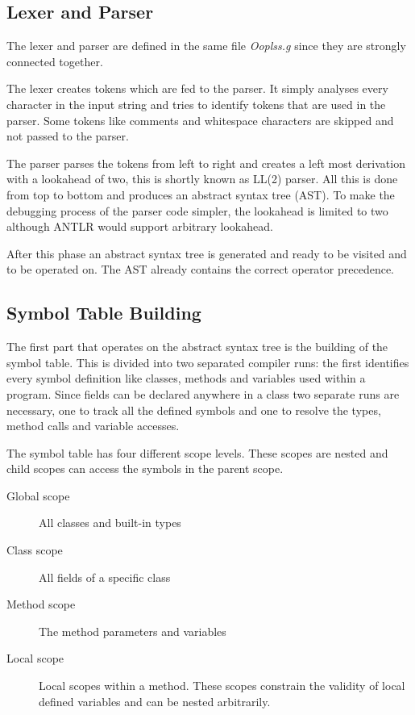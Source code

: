 \subsection{Lexer and Parser}
The lexer and parser are defined in the same file \emph{Ooplss.g}
since they are strongly connected together. 

The lexer creates tokens which are fed to the parser. It simply
analyses every character in the input string and tries to identify tokens
that are used in the parser. Some tokens like comments and whitespace characters 
are skipped and not passed to the parser.

The parser parses the tokens from left to right and creates a left most
derivation with a lookahead of two, this is shortly known as LL(2) parser.
All this is done from top to bottom and produces  an 
abstract syntax tree (AST). To make the debugging
process of the parser code simpler, the lookahead is limited to two although ANTLR
would support arbitrary lookahead.

After this phase an abstract syntax tree is generated and ready to be visited
and to be operated on. The AST already contains the correct operator precedence.

\subsection{Symbol Table Building}
The first part that operates on the abstract syntax tree is the building of
the symbol table. This is divided into two separated compiler runs: the
first identifies every symbol definition like classes, methods and
variables used within a program. Since fields can be declared anywhere
in a class two separate runs are necessary, one to track all the defined
symbols and one to resolve the types, method calls and variable accesses.

The symbol table has four different scope levels. These scopes are nested
and child scopes can access the symbols in the parent scope.
\begin{description}
	\item[Global scope] All classes and built-in types
	\item[Class scope] All fields of a specific class
	\item[Method scope] The method parameters and variables
	\item[Local scope] Local scopes within a method. These scopes
	constrain the validity of local defined variables and can be
	nested arbitrarily.
\end{description}


